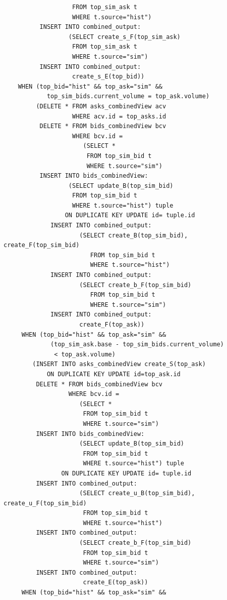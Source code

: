 \documentclass{article}
\begin{document}
\begin{verbatim}
                   FROM top_sim_ask t
                   WHERE t.source="hist")
          INSERT INTO combined_output:
                  (SELECT create_s_F(top_sim_ask)
                   FROM top_sim_ask t
                   WHERE t.source="sim")
          INSERT INTO combined_output:
                   create_s_E(top_bid))
    WHEN (top_bid="hist" && top_ask="sim" &&
            top_sim_bids.current_volume = top_ask.volume)
         (DELETE * FROM asks_combinedView acv
                   WHERE acv.id = top_asks.id
          DELETE * FROM bids_combinedView bcv
                   WHERE bcv.id = 
                      (SELECT *
                       FROM top_sim_bid t
                       WHERE t.source="sim")
          INSERT INTO bids_combinedView: 
                  (SELECT update_B(top_sim_bid)
                   FROM top_sim_bid t
                   WHERE t.source="hist") tuple
                 ON DUPLICATE KEY UPDATE id= tuple.id
             INSERT INTO combined_output:
                     (SELECT create_B(top_sim_bid), create_F(top_sim_bid)
                        FROM top_sim_bid t
                        WHERE t.source="hist")
             INSERT INTO combined_output:
                     (SELECT create_b_F(top_sim_bid)
                        FROM top_sim_bid t
                        WHERE t.source="sim")
             INSERT INTO combined_output:
                     create_F(top_ask))
     WHEN (top_bid="hist" && top_ask="sim" &&
             (top_sim_ask.base - top_sim_bids.current_volume)
              < top_ask.volume)
        (INSERT INTO asks_combinedView create_S(top_ask)
            ON DUPLICATE KEY UPDATE id=top_ask.id
         DELETE * FROM bids_combinedView bcv
                  WHERE bcv.id = 
                     (SELECT *
                      FROM top_sim_bid t
                      WHERE t.source="sim")
         INSERT INTO bids_combinedView: 
                     (SELECT update_B(top_sim_bid)
                      FROM top_sim_bid t
                      WHERE t.source="hist") tuple
                ON DUPLICATE KEY UPDATE id= tuple.id
         INSERT INTO combined_output:
                     (SELECT create_u_B(top_sim_bid), create_u_F(top_sim_bid)
                      FROM top_sim_bid t
                      WHERE t.source="hist")
         INSERT INTO combined_output:
                     (SELECT create_b_F(top_sim_bid)
                      FROM top_sim_bid t
                      WHERE t.source="sim")           
         INSERT INTO combined_output:
                      create_E(top_ask))
     WHEN (top_bid="hist" && top_ask="sim" &&

\end{verbatim}
\end{document}
